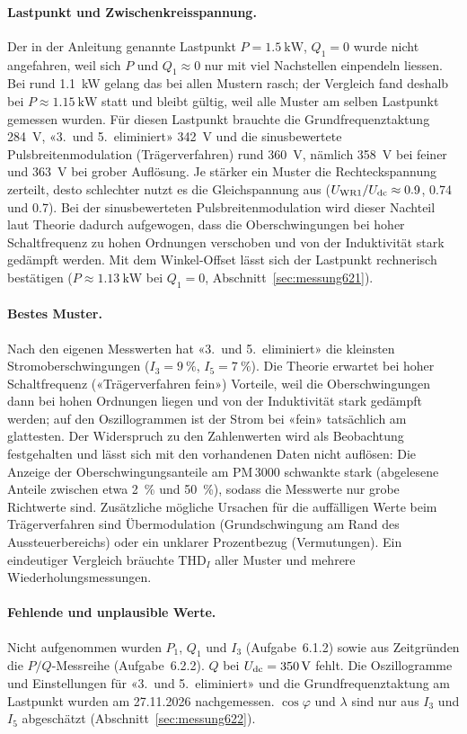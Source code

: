 \paragraph{Lastpunkt und Zwischenkreisspannung.} Der in der Anleitung genannte Lastpunkt $P=\SI{1.5}{\kilo\watt}$, $Q_1=0$ wurde nicht angefahren, weil sich $P$ und $Q_1\approx0$ nur mit viel Nachstellen einpendeln liessen. Bei rund \SI{1.1}{\kilo\watt} gelang das bei allen Mustern rasch; der Vergleich fand deshalb bei $P\approx\SI{1.15}{\kilo\watt}$ statt und bleibt gültig, weil alle Muster am selben Lastpunkt gemessen wurden. Für diesen Lastpunkt brauchte die Grundfrequenztaktung \SI{284}{\volt}, «3.\ und 5.\ eliminiert» \SI{342}{\volt} und die sinusbewertete Pulsbreitenmodulation (Trägerverfahren) rund \SI{360}{\volt}, nämlich \SI{358}{\volt} bei feiner und \SI{363}{\volt} bei grober Auflösung. Je stärker ein Muster die Rechteckspannung zerteilt, desto schlechter nutzt es die Gleichspannung aus ($U_{\mathrm{WR1}}/U_{\mathrm{dc}}\approx0.9$, 0.74 und 0.7). Bei der sinusbewerteten Pulsbreitenmodulation wird dieser Nachteil laut Theorie dadurch aufgewogen, dass die Oberschwingungen bei hoher Schaltfrequenz zu hohen Ordnungen verschoben und von der Induktivität stark gedämpft werden. Mit dem Winkel-Offset lässt sich der Lastpunkt rechnerisch bestätigen ($P\approx\SI{1.13}{\kilo\watt}$ bei $Q_1=0$, Abschnitt~\ref{sec:messung621}).

\paragraph{Bestes Muster.} Nach den eigenen Messwerten hat «3.\ und 5.\ eliminiert» die kleinsten Stromoberschwingungen ($I_3=\SI{9}{\percent}$, $I_5=\SI{7}{\percent}$). Die Theorie erwartet bei hoher Schaltfrequenz («Trägerverfahren fein») Vorteile, weil die Oberschwingungen dann bei hohen Ordnungen liegen und von der Induktivität stark gedämpft werden; auf den Oszillogrammen ist der Strom bei «fein» tatsächlich am glattesten. Der Widerspruch zu den Zahlenwerten wird als Beobachtung festgehalten und lässt sich mit den vorhandenen Daten nicht auflösen: Die Anzeige der Oberschwingungsanteile am PM\,3000 schwankte stark (abgelesene Anteile zwischen etwa \SI{2}{\percent} und \SI{50}{\percent}), sodass die Messwerte nur grobe Richtwerte sind. Zusätzliche mögliche Ursachen für die auffälligen Werte beim Trägerverfahren sind Übermodulation (Grundschwingung am Rand des Aussteuerbereichs) oder ein unklarer Prozentbezug (Vermutungen). Ein eindeutiger Vergleich bräuchte $\mathrm{THD}_I$ aller Muster und mehrere Wiederholungsmessungen.

\paragraph{Fehlende und unplausible Werte.} Nicht aufgenommen wurden $P_1$, $Q_1$ und $I_3$ (Aufgabe~6.1.2) sowie aus Zeitgründen die $P/Q$-Messreihe (Aufgabe~6.2.2). $Q$ bei $U_{\mathrm{dc}}=\SI{350}{\volt}$ fehlt. Die Oszillogramme und Einstellungen für «3.\ und 5.\ eliminiert» und die Grundfrequenztaktung am Lastpunkt wurden am 27.11.2026 nachgemessen. $\cos\varphi$ und $\lambda$ sind nur aus $I_3$ und $I_5$ abgeschätzt (Abschnitt~\ref{sec:messung622}).
